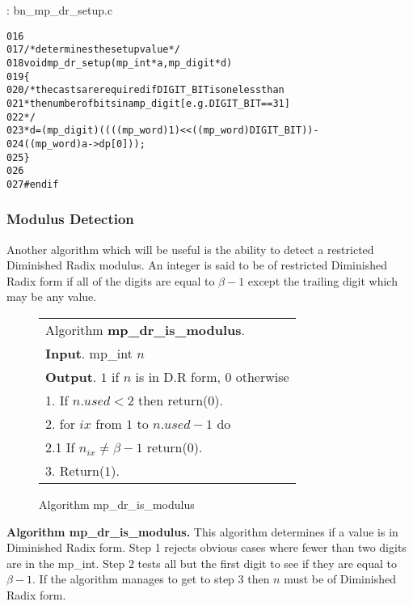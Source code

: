 \documentclass[b5paper]{book}
\begin{document}
\vspace{+3mm}\begin{small}
\hspace{-5.1mm}{\bf File}: bn\_mp\_dr\_setup.c
\vspace{-3mm}
\begin{alltt}
016   
017   /* determines the setup value */
018   void mp_dr_setup(mp_int *a, mp_digit *d)
019   \{
020      /* the casts are required if DIGIT_BIT is one less than
021       * the number of bits in a mp_digit [e.g. DIGIT_BIT==31]
022       */
023      *d = (mp_digit)((((mp_word)1) << ((mp_word)DIGIT_BIT)) - 
024           ((mp_word)a->dp[0]));
025   \}
026   
027   #endif
\end{alltt}
\end{small}

\subsubsection{Modulus Detection}
Another algorithm which will be useful is the ability to detect a restricted Diminished Radix modulus.  An integer is said to be
of restricted Diminished Radix form if all of the digits are equal to $\beta - 1$ except the trailing digit which may be any value.

\begin{figure}[!here]
\begin{small}
\begin{center}
\begin{tabular}{l}
\hline Algorithm \textbf{mp\_dr\_is\_modulus}. \\
\textbf{Input}.   mp\_int $n$ \\
\textbf{Output}.  $1$ if $n$ is in D.R form, $0$ otherwise \\
\hline
1.  If $n.used < 2$ then return($0$). \\
2.  for $ix$ from $1$ to $n.used - 1$ do \\
\hspace{3mm}2.1  If $n_{ix} \ne \beta - 1$ return($0$). \\
3.  Return($1$). \\
\hline
\end{tabular}
\end{center}
\end{small}
\caption{Algorithm mp\_dr\_is\_modulus}
\end{figure}

\textbf{Algorithm mp\_dr\_is\_modulus.}
This algorithm determines if a value is in Diminished Radix form.  Step 1 rejects obvious cases where fewer than two digits are
in the mp\_int.  Step 2 tests all but the first digit to see if they are equal to $\beta - 1$.  If the algorithm manages to get to
step 3 then $n$ must be of Diminished Radix form.
\end{document}
